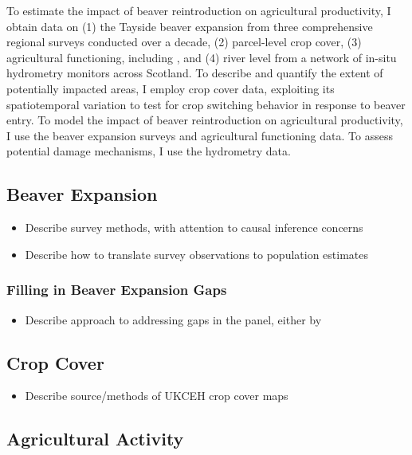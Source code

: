 To estimate the impact of beaver reintroduction on agricultural productivity, I obtain data on (1) the Tayside beaver expansion from three comprehensive regional surveys conducted over a decade, (2) parcel-level crop cover, (3) agricultural functioning, including , and (4) river level from a network of in-situ hydrometry monitors across Scotland. To describe and quantify the extent of potentially impacted areas, I employ crop cover data, exploiting its spatiotemporal variation to test for crop switching behavior in response to beaver entry. To model the impact of beaver reintroduction on agricultural productivity, I use the beaver expansion surveys and agricultural functioning data. To assess potential damage mechanisms, I use the hydrometry data.  

\subsection{Beaver Expansion}
\begin{itemize}
    \item Describe survey methods, with attention to causal inference concerns
    \item Describe how to translate survey observations to population estimates
\end{itemize}

\subsubsection{Filling in Beaver Expansion Gaps}

\begin{itemize}
    \item Describe approach to addressing gaps in the panel, either by 
\end{itemize}

\subsection{Crop Cover}
\begin{itemize}
    \item Describe source/methods of UKCEH crop cover maps
\end{itemize}

\subsection{Agricultural Activity}

